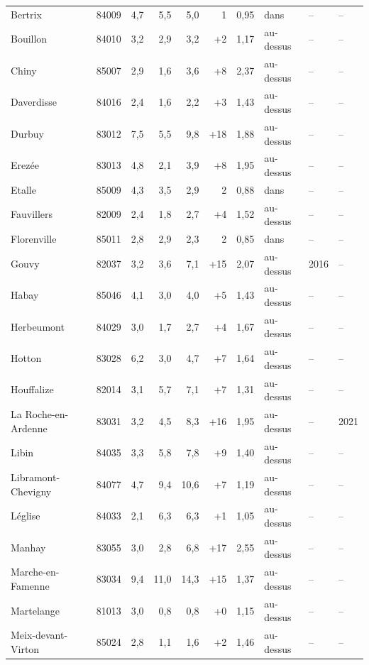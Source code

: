 \begin{longtable}{lrrrrrrlll}
Bertrix & 84009 & 4{,}7 & 5{,}5 & 5{,}0 & \textminus{}1 & 0{,}95 & dans & -- & -- \\
Bouillon & 84010 & 3{,}2 & 2{,}9 & 3{,}2 & +2 & 1{,}17 & au-dessus & -- & -- \\
Chiny & 85007 & 2{,}9 & 1{,}6 & 3{,}6 & +8 & 2{,}37 & au-dessus & -- & -- \\
Daverdisse & 84016 & 2{,}4 & 1{,}6 & 2{,}2 & +3 & 1{,}43 & au-dessus & -- & -- \\
Durbuy & 83012 & 7{,}5 & 5{,}5 & 9{,}8 & +18 & 1{,}88 & au-dessus & -- & -- \\
Erezée & 83013 & 4{,}8 & 2{,}1 & 3{,}9 & +8 & 1{,}95 & au-dessus & -- & -- \\
Etalle & 85009 & 4{,}3 & 3{,}5 & 2{,}9 & \textminus{}2 & 0{,}88 & dans & -- & -- \\
Fauvillers & 82009 & 2{,}4 & 1{,}8 & 2{,}7 & +4 & 1{,}52 & au-dessus & -- & -- \\
Florenville & 85011 & 2{,}8 & 2{,}9 & 2{,}3 & \textminus{}2 & 0{,}85 & dans & -- & -- \\
Gouvy & 82037 & 3{,}2 & 3{,}6 & 7{,}1 & +15 & 2{,}07 & au-dessus & 2016 & -- \\
Habay & 85046 & 4{,}1 & 3{,}0 & 4{,}0 & +5 & 1{,}43 & au-dessus & -- & -- \\
Herbeumont & 84029 & 3{,}0 & 1{,}7 & 2{,}7 & +4 & 1{,}67 & au-dessus & -- & -- \\
Hotton & 83028 & 6{,}2 & 3{,}0 & 4{,}7 & +7 & 1{,}64 & au-dessus & -- & -- \\
Houffalize & 82014 & 3{,}1 & 5{,}7 & 7{,}1 & +7 & 1{,}31 & au-dessus & -- & -- \\
La Roche-en-Ardenne & 83031 & 3{,}2 & 4{,}5 & 8{,}3 & +16 & 1{,}95 & au-dessus & -- & 2021 \\
Libin & 84035 & 3{,}3 & 5{,}8 & 7{,}8 & +9 & 1{,}40 & au-dessus & -- & -- \\
Libramont-Chevigny & 84077 & 4{,}7 & 9{,}4 & 10{,}6 & +7 & 1{,}19 & au-dessus & -- & -- \\
Léglise & 84033 & 2{,}1 & 6{,}3 & 6{,}3 & +1 & 1{,}05 & au-dessus & -- & -- \\
Manhay & 83055 & 3{,}0 & 2{,}8 & 6{,}8 & +17 & 2{,}55 & au-dessus & -- & -- \\
Marche-en-Famenne & 83034 & 9{,}4 & 11{,}0 & 14{,}3 & +15 & 1{,}37 & au-dessus & -- & -- \\
Martelange & 81013 & 3{,}0 & 0{,}8 & 0{,}8 & +0 & 1{,}15 & au-dessus & -- & -- \\
Meix-devant-Virton & 85024 & 2{,}8 & 1{,}1 & 1{,}6 & +2 & 1{,}46 & au-dessus & -- & -- \\

\end{longtable}
